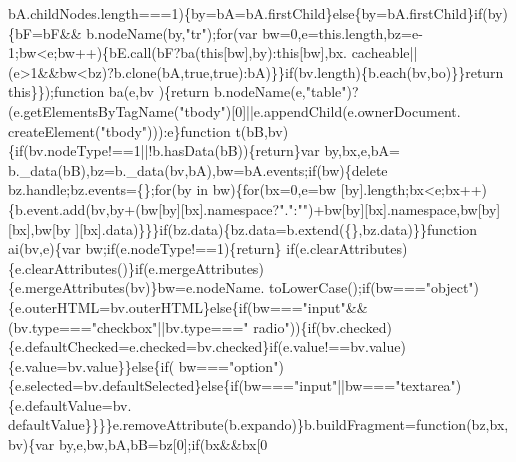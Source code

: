 \begin{DoxyCode}
{      bA.childNodes.length===1)\{by=bA=bA.firstChild\}\textcolor{keywordflow}{else}\{by=bA.firstChild\}\textcolor{keywordflow}{if}(by)\{bF=bF&&
      b.nodeName(by,\textcolor{stringliteral}{"tr"});\textcolor{keywordflow}{for}(var bw=0,e=this.length,bz=e-1;bw<e;bw++)\{bE.call(bF?ba(\textcolor{keyword}{this}[bw],by):\textcolor{keyword}{this}[bw],bx.
      cacheable||(e>1&&bw<bz)?b.clone(bA,\textcolor{keyword}{true},\textcolor{keyword}{true}):bA)\}\}\textcolor{keywordflow}{if}(bv.length)\{b.each(bv,bo)\}\}\textcolor{keywordflow}{return} \textcolor{keyword}{this}\}\});\textcolor{keyword}{function} ba(e,bv
      )\{\textcolor{keywordflow}{return} b.nodeName(e,\textcolor{stringliteral}{"table"})?(e.getElementsByTagName(\textcolor{stringliteral}{"tbody"})[0]||e.appendChild(e.ownerDocument.
      createElement(\textcolor{stringliteral}{"tbody"}))):e\}\textcolor{keyword}{function} t(bB,bv)\{\textcolor{keywordflow}{if}(bv.nodeType!==1||!b.hasData(bB))\{\textcolor{keywordflow}{return}\}var by,bx,e,bA=
      b.\_data(bB),bz=b.\_data(bv,bA),bw=bA.events;\textcolor{keywordflow}{if}(bw)\{\textcolor{keyword}{delete} bz.handle;bz.events=\{\};\textcolor{keywordflow}{for}(by in bw)\{\textcolor{keywordflow}{for}(bx=0,e=bw
      [by].length;bx<e;bx++)\{b.event.add(bv,by+(bw[by][bx].\textcolor{keyword}{namespace}?\textcolor{stringliteral}{"."}:\textcolor{stringliteral}{""})+bw[by][bx].\textcolor{keyword}{namespace},bw[by][bx],bw[by
      ][bx].data)\}\}\}\textcolor{keywordflow}{if}(bz.data)\{bz.data=b.extend(\{\},bz.data)\}\}\textcolor{keyword}{function} ai(bv,e)\{var bw;\textcolor{keywordflow}{if}(e.nodeType!==1)\{\textcolor{keywordflow}{return}\}\textcolor{keywordflow}{
      if}(e.clearAttributes)\{e.clearAttributes()\}\textcolor{keywordflow}{if}(e.mergeAttributes)\{e.mergeAttributes(bv)\}bw=e.nodeName.
      toLowerCase();\textcolor{keywordflow}{if}(bw===\textcolor{stringliteral}{"object"})\{e.outerHTML=bv.outerHTML\}\textcolor{keywordflow}{else}\{\textcolor{keywordflow}{if}(bw===\textcolor{stringliteral}{"input"}&&(bv.type===\textcolor{stringliteral}{"checkbox"}||bv.type===\textcolor{stringliteral}{"
      radio"}))\{\textcolor{keywordflow}{if}(bv.checked)\{e.defaultChecked=e.checked=bv.checked\}\textcolor{keywordflow}{if}(e.value!==bv.value)\{e.value=bv.value\}\}\textcolor{keywordflow}{else}\{\textcolor{keywordflow}{if}(
      bw===\textcolor{stringliteral}{"option"})\{e.selected=bv.defaultSelected\}\textcolor{keywordflow}{else}\{\textcolor{keywordflow}{if}(bw===\textcolor{stringliteral}{"input"}||bw===\textcolor{stringliteral}{"textarea"})\{e.defaultValue=bv.
      defaultValue\}\}\}\}e.removeAttribute(b.expando)\}b.buildFragment=\textcolor{keyword}{function}(bz,bx,bv)\{var by,e,bw,bA,bB=bz[0];\textcolor{keywordflow}{if}(bx&&bx[0
}
\end{DoxyCode}
